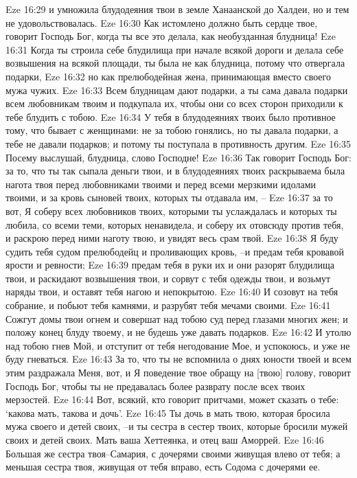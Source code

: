 Eze 16:29  и умножила блудодеяния твои в земле Ханаанской до Халдеи, но и тем не удовольствовалась.
Eze 16:30  Как истомлено должно быть сердце твое, говорит Господь Бог, когда ты все это делала, как необузданная блудница!
Eze 16:31  Когда ты строила себе блудилища при начале всякой дороги и делала себе возвышения на всякой площади, ты была не как блудница, потому что отвергала подарки,
Eze 16:32  но как прелюбодейная жена, принимающая вместо своего мужа чужих.
Eze 16:33  Всем блудницам дают подарки, а ты сама давала подарки всем любовникам твоим и подкупала их, чтобы они со всех сторон приходили к тебе блудить с тобою.
Eze 16:34  У тебя в блудодеяниях твоих было противное тому, что бывает с женщинами: не за тобою гонялись, но ты давала подарки, а тебе не давали подарков; и потому ты поступала в противность другим.
Eze 16:35  Посему выслушай, блудница, слово Господне!
Eze 16:36  Так говорит Господь Бог: за то, что ты так сыпала деньги твои, и в блудодеяниях твоих раскрываема была нагота твоя перед любовниками твоими и перед всеми мерзкими идолами твоими, и за кровь сыновей твоих, которых ты отдавала им, --
Eze 16:37  за то вот, Я соберу всех любовников твоих, которыми ты услаждалась и которых ты любила, со всеми теми, которых ненавидела, и соберу их отовсюду против тебя, и раскрою перед ними наготу твою, и увидят весь срам твой.
Eze 16:38  Я буду судить тебя судом прелюбодейц и проливающих кровь, --и предам тебя кровавой ярости и ревности;
Eze 16:39  предам тебя в руки их и они разорят блудилища твои, и раскидают возвышения твои, и сорвут с тебя одежды твои, и возьмут наряды твои, и оставят тебя нагою и непокрытою.
Eze 16:40  И созовут на тебя собрание, и побьют тебя камнями, и разрубят тебя мечами своими.
Eze 16:41  Сожгут домы твои огнем и совершат над тобою суд перед глазами многих жен; и положу конец блуду твоему, и не будешь уже давать подарков.
Eze 16:42  И утолю над тобою гнев Мой, и отступит от тебя негодование Мое, и успокоюсь, и уже не буду гневаться.
Eze 16:43  За то, что ты не вспомнила о днях юности твоей и всем этим раздражала Меня, вот, и Я поведение твое обращу на [твою] голову, говорит Господь Бог, чтобы ты не предавалась более разврату после всех твоих мерзостей.
Eze 16:44  Вот, всякий, кто говорит притчами, может сказать о тебе: `какова мать, такова и дочь'.
Eze 16:45  Ты дочь в мать твою, которая бросила мужа своего и детей своих, --и ты сестра в сестер твоих, которые бросили мужей своих и детей своих. Мать ваша Хеттеянка, и отец ваш Аморрей.
Eze 16:46  Большая же сестра твоя--Самария, с дочерями своими живущая влево от тебя; а меньшая сестра твоя, живущая от тебя вправо, есть Содома с дочерями ее.
